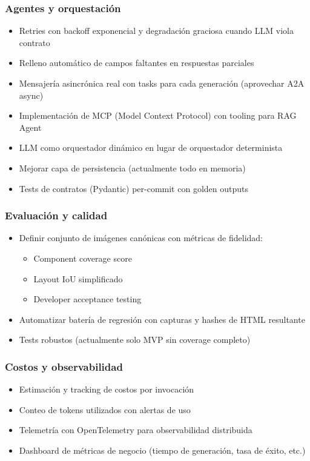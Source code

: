 \documentclass[12pt,a4paper]{article}
\begin{document}
\subsubsection{Agentes y orquestación}

\begin{itemize}
    \item Retries con backoff exponencial y degradación graciosa cuando LLM viola contrato
    \item Relleno automático de campos faltantes en respuestas parciales
    \item Mensajería asincrónica real con tasks para cada generación (aprovechar A2A async)
    \item Implementación de MCP (Model Context Protocol) con tooling para RAG Agent
    \item LLM como orquestador dinámico en lugar de orquestador determinista
    \item Mejorar capa de persistencia (actualmente todo en memoria)
    \item Tests de contratos (Pydantic) per-commit con golden outputs
\end{itemize}

\subsubsection{Evaluación y calidad}

\begin{itemize}
    \item Definir conjunto de imágenes canónicas con métricas de fidelidad:
    \begin{itemize}
        \item Component coverage score
        \item Layout IoU simplificado
        \item Developer acceptance testing
    \end{itemize}
    \item Automatizar batería de regresión con capturas y hashes de HTML resultante
    \item Tests robustos (actualmente solo MVP sin coverage completo)
\end{itemize}

\subsubsection{Costos y observabilidad}

\begin{itemize}
    \item Estimación y tracking de costos por invocación
    \item Conteo de tokens utilizados con alertas de uso
    \item Telemetría con OpenTelemetry para observabilidad distribuida
    \item Dashboard de métricas de negocio (tiempo de generación, tasa de éxito, etc.)
\end{itemize}
\end{document}
